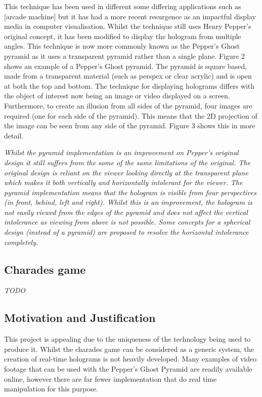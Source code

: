 This technique has been used in different some differing applications such as [arcade machine] but it has had a more recent resurgence as an impactful display media in computer visualisation. Whilst the technique still uses Henry Pepper's original concept, it has been modified to display the hologram from multiple angles. This technique is now more commonly known as the Pepper's Ghost pyramid as it uses a transparent pyramid rather than a single plane. Figure 2 shows an example of a Pepper's Ghost pyramid. The pyramid is square based, made from a transparent material (such as perspex or clear acrylic) and is open at both the top and bottom. The technique for displaying holograms differs with the object of interest now being an image or video displayed on a screen. Furthermore, to create an illusion from all sides of the pyramid, four images are required (one for each side of the pyramid). This  means that the 2D projection of the image can be seen from any side of the pyramid. Figure 3 shows this in more detail. 

\textit{Whilst the pyramid implementation is an improvement on Pepper's original design it still suffers from the some of the same limitations of the original. The original design is reliant on the viewer looking directly at the transparent plane which makes it both vertically and horizontally intolerant for the viewer. The pyramid implementation means that the hologram is visible from four perspectives (in front, behind, left and right). Whilst this is an improvement, the hologram is not easily viewed from the edges of the pyramid and does not affect the vertical intolerance as viewing from above is not possible. Some concepts for a spherical design (instead of a pyramid) are proposed to resolve the horizontal intolerance completely.}

\subsection{Charades game}
\textit{TODO}


\subsection{Motivation and Justification}
This project is appealing due to the uniqueness of the technology being used to produce it. Whilst the charades game can be considered as a generic system, the creation of real-time holograms is not heavily developed. Many examples of video footage that can be used with the Pepper's Ghost Pyramid are readily available online, however there are far fewer implementation that do real time manipulation for this purpose.

